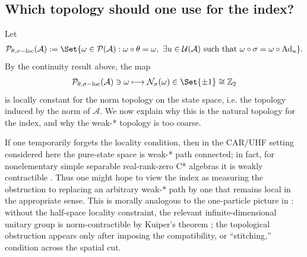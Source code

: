 \documentclass[a4paper,10pt]{article}
\numberwithin{equation}{section}
\theoremstyle{plain}
\theoremstyle{plain}
\theoremstyle{plain}
\theoremstyle{plain}
\theoremstyle{plain}
\theoremstyle{remark}
\theoremstyle{definition}
\newcommand{\ZZ}{\mathbb{Z}}
\newcommand{\calA}{\mathcal{A}}
\newcommand{\calN}{\mathcal{N}}
\newcommand{\calU}{\mathcal{U}}
\newcommand{\calP}{\mathcal{P}}
\newcommand{\Ad}[1]{\operatorname{Ad}_{#1}}
\newcommand{\Id}{\mathds{1}}
\newcommand{\sgn}{\operatorname{sgn}}
\newcommand{\im}{\operatorname{im}}
\newcommand{\eq}[1]{\begin{align*}#1\end{align*}}
\begin{document}
%
\subsection{Which topology should one use for the index?}
Let
\eq{
\calP_{\theta,\sigma\mathrm{-loc}}(\calA)
:=
\Set{
\omega\in\calP(\calA):
\omega\circ\theta=\omega,\
\exists u\in\calU(\calA)\text{ such that }
\omega\circ\sigma=\omega\circ\Ad{u}
}.
}
By the continuity result above, the map
\eq{
\calP_{\theta,\sigma\mathrm{-loc}}(\calA)
\ni
\omega
\longmapsto
\calN_\sigma(\omega)
\in \Set{\pm1}\cong\ZZ_2
}
is locally constant for the norm topology on the state space, i.e. the topology induced by the norm of $\calA$. We now explain why this is the natural topology for the index, and why the weak-* topology is too coarse.

If one temporarily forgets the locality condition, then in the CAR/UHF setting considered here the pure-state space is weak-* path connected; in fact, for nonelementary simple separable real-rank-zero C* algebras it is weakly contractible \cite{SpiegelPflaum2025WeakContractibility}. Thus one might hope to view the index as measuring the obstruction to replacing an arbitrary weak-$*$ path by one that remains local in the appropriate sense. This is morally analogous to the one-particle picture in \cite{ChungShapiro2023}: without the half-space locality constraint, the relevant infinite-dimensional unitary group is norm-contractible by Kuiper's theorem \cite{Kuiper1965HomotopyType}; the topological obstruction appears only after imposing the compatibility, or ``stitching,'' condition across the spatial cut.
\end{document}
